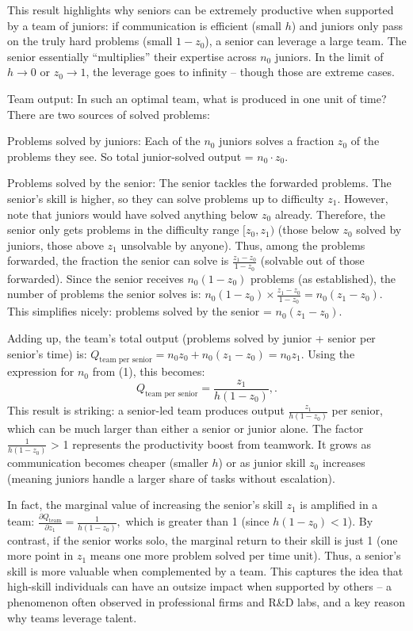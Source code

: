 \documentclass[12pt]{article}
\begin{document}
This result highlights why seniors can be extremely productive when
supported by a team of juniors: if communication is efficient (small
\(h\)) and juniors only pass on the truly hard problems (small
\(1-z_0\)), a senior can leverage a large team. {The senior
essentially ``multiplies'' their expertise across \(n_0\) juniors.} In
the limit of \(h \to 0\) or \(z_0 \to 1\), the leverage goes to infinity
-- though those are extreme cases.

{Team output:} In such an optimal team, what is produced in one
unit of time? There are two sources of solved problems:

{Problems solved by juniors:} Each of the \(n_0\) juniors
  solves a fraction \(z_0\) of the problems they see. So total
  junior-solved output = \(n_0 \cdot z_0\).

{Problems solved by the senior:} The senior tackles the
forwarded problems. The senior's skill is higher, so they can solve
problems up to difficulty \(z_1\). However, note that juniors would
have solved anything below \(z_0\) already. Therefore, the senior only
{gets} problems in the difficulty range \([z_0, z_1)\) (those
below \(z_0\) solved by juniors, those above
$z_1$ unsolvable by anyone). Thus, among the problems forwarded, the fraction the senior can solve is \(\frac{z_1 - z_0}{1 - z_0}\)
(solvable out of those forwarded). Since the senior receives
\(n_0(1-z_0)\) problems (as established), the number of problems the
senior solves is:
\(n_0 (1-z_0) \times \frac{z_1 - z_0}{1 - z_0} = n_0(z_1 - z_0).\)
This simplifies nicely: {problems solved by the senior =
\(n_0 (z_1 - z_0)\).}

Adding up, the {team's total output} (problems solved by junior +
senior per senior's time) is:
\(Q_{\text{team per senior}} = n_0 z_0 + n_0 (z_1 - z_0) = n_0 z_1.\)
Using the expression for \(n_0\) from (1), this becomes: 
\begin{equation}
Q_{\text{team per senior}}  =  \frac{z_1}{h(1 - z_0)},. \tag{2}
\end{equation}
This result is striking: a senior-led team produces output
\(\frac{z_1}{h(1-z_0)}\) per senior, which can be much larger than
either a senior or junior alone. The factor \(\frac{1}{h(1-z_0)}\)
\textgreater{} 1 represents the {productivity boost from
teamwork}. It grows as communication becomes cheaper (smaller \(h\)) or
as junior skill \(z_0\) increases (meaning juniors handle a larger share
of tasks without escalation).

In fact, the marginal value of increasing the senior's skill \(z_1\) is
amplified in a team:
\(\frac{\partial Q_{\text{team}}}{\partial z_1} = \frac{1}{h(1-z_0)},\)
which is greater than 1 (since \(h(1-z_0)<1\)). By contrast, if the
senior works {solo}, the marginal return to their skill is just 1
(one more point in \(z_1\) means one more problem solved per time unit).
{Thus, a senior's skill is more valuable when complemented by a
team}. This captures the idea that high-skill individuals can have an
outsize impact when supported by others -- a phenomenon often observed
in professional firms and R\&D labs, and a key reason why {teams
leverage talent}.
\end{document}
